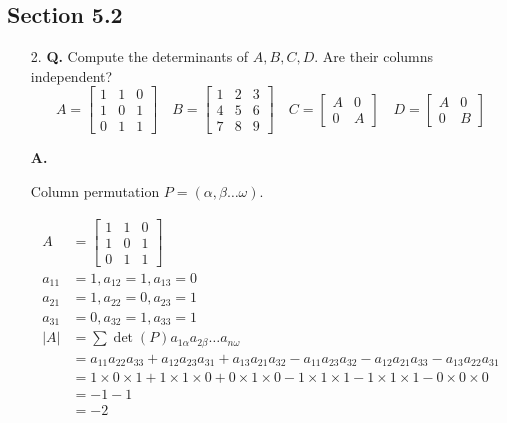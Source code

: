 \documentclass[main.tex]{subfiles}
\begin{document}
\subsection{Section 5.2}
\begin{enumerate}
    \item [2.] \textbf{Q.} Compute the determinants of $A, B, C, D$. Are their columns independent?
    $$
    A=\left[\begin{array}{lll}
    1 & 1 & 0 \\
    1 & 0 & 1 \\
    0 & 1 & 1
    \end{array}\right] \quad B=\left[\begin{array}{lll}
    1 & 2 & 3 \\
    4 & 5 & 6 \\
    7 & 8 & 9
    \end{array}\right] \quad C=\left[\begin{array}{ll}
    A & 0 \\
    0 & A
    \end{array}\right] \quad D=\left[\begin{array}{cc}
    A & 0 \\
    0 & B
    \end{array}\right]
    $$
    
    \textbf{A.}
    
    Column permutation $P=(\alpha, \beta \ldots \omega)$.
    
    $$
    \begin{aligned}
    A&=\left[\begin{array}{lll}
    1 & 1 & 0 \\
    1 & 0 & 1 \\
    0 & 1 & 1
    \end{array}\right]\\
    a_{11}&=1, a_{12}=1, a_{13}=0 \\
    a_{21}&=1, a_{22}=0, a_{23}=1 \\
    a_{31}&=0, a_{32}=1, a_{33}=1 \\
    |A|&=\sum \operatorname{det}(P) a_{1 \alpha} a_{2 \beta} \ldots a_{n \omega}\\
    &=a_{11} a_{22} a_{33}+a_{12} a_{23} a_{31}+a_{13} a_{21} a_{32}-a_{11} a_{23} a_{32}-a_{12} a_{21} a_{33}-a_{13} a_{22} a_{31} \\
    &=1 \times 0 \times 1+1 \times 1 \times 0+0 \times 1 \times 0-1 \times 1 \times 1-1 \times 1 \times 1-0 \times 0 \times 0 \\
    &=-1-1 \\
    &=-2
    \end{aligned}
    $$
    

\end{enumerate}
\end{document}
